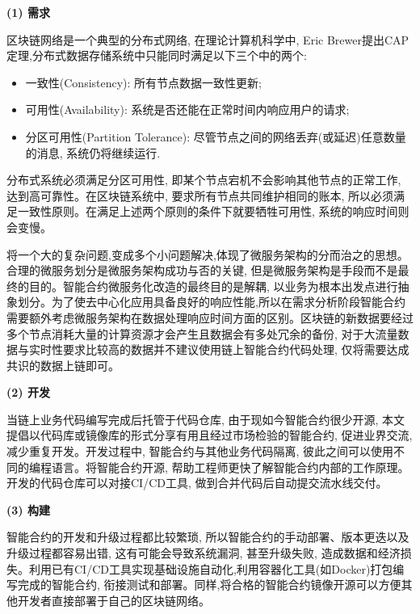 \textbf{(1) 需求}

区块链网络是一个典型的分布式网络, 在理论计算机科学中, Eric Brewer提出CAP定理\footnotemark[1],分布式数据存储系统中只能同时满足以下三个中的两个:

\begin{itemize}[itemindent=2em]
    \item 一致性(Consistency): 所有节点数据一致性更新;

    \item 可用性(Availability): 系统是否还能在正常时间内响应用户的请求;

    \item 分区可用性(Partition Tolerance): 尽管节点之间的网络丢弃(或延迟)任意数量的消息, 系统仍将继续运行.

\end{itemize}

分布式系统必须满足分区可用性, 即某个节点宕机不会影响其他节点的正常工作, 达到高可靠性。在区块链系统中, 要求所有节点共同维护相同的账本, 所以必须满足一致性原则。在满足上述两个原则的条件下就要牺牲可用性, 系统的响应时间则会变慢。

将一个大的复杂问题,变成多个小问题解决,体现了微服务架构的分而治之的思想。合理的微服务划分是微服务架构成功与否的关键, 但是微服务架构是手段而不是最终的目的。智能合约微服务化改造的最终目的是解耦, 以业务为根本出发点进行抽象划分。为了使去中心化应用具备良好的响应性能,所以在需求分析阶段智能合约需要额外考虑微服务架构在数据处理响应时间方面的区别。区块链的新数据要经过多个节点消耗大量的计算资源才会产生且数据会有多处冗余的备份, 对于大流量数据与实时性要求比较高的数据并不建议使用链上智能合约代码处理, 仅将需要达成共识的数据上链即可。


\textbf{(2) 开发}

当链上业务代码编写完成后托管于代码仓库, 由于现如今智能合约很少开源, 本文提倡以代码库或镜像库的形式分享有用且经过市场检验的智能合约, 促进业界交流, 减少重复开发。开发过程中, 智能合约与其他业务代码隔离, 彼此之间可以使用不同的编程语言。将智能合约开源, 帮助工程师更快了解智能合约内部的工作原理。开发的代码仓库可以对接CI/CD工具, 做到合并代码后自动提交流水线交付。


\textbf{(3) 构建}

智能合约的开发和升级过程都比较繁琐, 所以智能合约的手动部署、版本更迭以及升级过程都容易出错, 这有可能会导致系统漏洞, 甚至升级失败, 造成数据和经济损失。利用已有CI/CD工具实现基础设施自动化,利用容器化工具(如Docker)打包编写完成的智能合约, 衔接测试和部署。同样,将合格的智能合约镜像开源可以方便其他开发者直接部署于自己的区块链网络。

